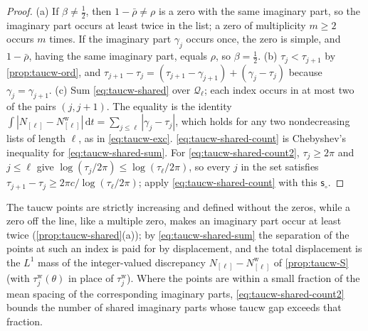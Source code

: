 \documentclass[11pt,a4paper]{article}
\numberwithin{equation}{section}
\theoremstyle{definition}
\theoremstyle{remark}
\newcommand{\dd}{\,\mathrm dt}
\begin{document}
\begin{proof}
(a) If $\beta\ne\frac12$, then $1-\bar\rho\ne\rho$ is a zero with the same imaginary part, so the imaginary part occurs at least twice in the list; a zero of multiplicity $m\ge2$ occurs $m$ times. If the imaginary part $\gamma_j$ occurs once, the zero is simple, and $1-\bar\rho$, having the same imaginary part, equals $\rho$, so $\beta=\frac12$. (b) $\tau_j<\tau_{j+1}$ by \cref{prop:taucw-ord}, and $\tau_{j+1}-\tau_j=(\tau_{j+1}-\gamma_{j+1})+(\gamma_j-\tau_j)$ because $\gamma_j=\gamma_{j+1}$. (c) Sum \eqref{eq:taucw-shared} over $\mathcal Q_\ell$; each index occurs in at most two of the pairs $(j,j+1)$. The equality is the identity $\int|N_{[\ell]}-N^{\mathrm w}_{[\ell]}|\dd=\sum_{j\le\ell}|\gamma_j-\tau_j|$, which holds for any two nondecreasing lists of length $\ell$, as in \eqref{eq:taucw-exc}. \eqref{eq:taucw-shared-count} is Chebyshev's inequality for \eqref{eq:taucw-shared-sum}. For \eqref{eq:taucw-shared-count2}, $\tau_j\ge2\pi$ and $j\le\ell$ give $\log(\tau_j/2\pi)\le\log(\tau_\ell/2\pi)$, so every $j$ in the set satisfies $\tau_{j+1}-\tau_j\ge2\pi c/\log(\tau_\ell/2\pi)$; apply \eqref{eq:taucw-shared-count} with this $\mathsf s_\circ$.
\end{proof}
The taucw points are strictly increasing and defined without the zeros, while a zero off the line, like a multiple zero, makes an imaginary part occur at least twice (\cref{prop:taucw-shared}(a)); by \eqref{eq:taucw-shared-sum} the separation of the points at such an index is paid for by displacement, and the total displacement is the $L^1$ mass of the integer-valued discrepancy $N_{[\ell]}-N^{\mathrm w}_{[\ell]}$ of \cref{prop:taucw-S} (with $\tau_j^{\mathrm w}(\theta)$ in place of $\tau_j^{\mathrm w}$). Where the points are within a small fraction of the mean spacing of the corresponding imaginary parts, \eqref{eq:taucw-shared-count2} bounds the number of shared imaginary parts whose taucw gap exceeds that fraction.
\end{document}
